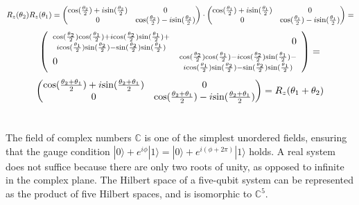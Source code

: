 \documentclass{article}
\begin{document}
$$R_z(\theta_2)R_z(\theta_1)=
\begin{pmatrix}
\textnormal{cos}(\frac{\theta_2}{2}) + i\textnormal{sin}(\frac{\theta_2}{2}) & 0\\
0 & \textnormal{cos}(\frac{\theta_2}{2}) - i\textnormal{sin}(\frac{\theta_2}{2})
\end{pmatrix}\cdot
\begin{pmatrix}
\textnormal{cos}(\frac{\theta_1}{2}) + i\textnormal{sin}(\frac{\theta_1}{2}) & 0\\
0 & \textnormal{cos}(\frac{\theta_1}{2}) - i\textnormal{sin}(\frac{\theta_1}{2})
\end{pmatrix}=
$$
$$
\begin{pmatrix}
\begin{array}{lr}
\substack{\textnormal{cos}(\frac{\theta_2}{2})\textnormal{cos}(\frac{\theta_1}{2}) + i\textnormal{cos}(\frac{\theta_2}{2})\textnormal{sin}(\frac{\theta_1}{2}) +\\ i\textnormal{cos}(\frac{\theta_1}{2})\textnormal{sin}(\frac{\theta_2}{2}) - \textnormal{sin}(\frac{\theta_2}{2})\textnormal{sin}(\frac{\theta_1}{2})} & 0\\
0 & \substack{\textnormal{cos}(\frac{\theta_2}{2})\textnormal{cos}(\frac{\theta_1}{2}) - i\textnormal{cos}(\frac{\theta_2}{2})\textnormal{sin}(\frac{\theta_1}{2}) -\\ i\textnormal{cos}(\frac{\theta_1}{2})\textnormal{sin}(\frac{\theta_2}{2}) - \textnormal{sin}(\frac{\theta_2}{2})\textnormal{sin}(\frac{\theta_1}{2})}
\end{array}
\end{pmatrix}=
$$
$$
\begin{pmatrix}
\textnormal{cos}(\frac{\theta_2+\theta_1}{2}) + i\textnormal{sin}(\frac{\theta_2+\theta_1}{2}) & 0\\
0 & \textnormal{cos}(\frac{\theta_2+\theta_1}{2}) - i\textnormal{sin}(\frac{\theta_2+\theta_1}{2})
\end{pmatrix}=
R_z(\theta_1+\theta_2)
$$

\section{}

The field of complex numbers $\mathbb{C}$ is one of the simplest unordered fields, ensuring that the gauge condition $|0\rangle+e^{i\phi}|1\rangle=|0\rangle+e^{i(\phi+2\pi)}|1\rangle$ holds. A real system does not suffice because there are only two roots of unity, as opposed to infinite in the complex plane. The Hilbert space of a five-qubit system can be represented as the product of five Hilbert spaces, and is isomorphic to $\mathbb{C}^5$.
\end{document}
